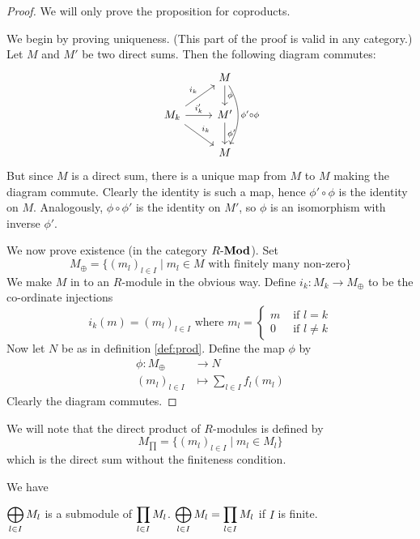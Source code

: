 \begin{proof}
	We will only prove the proposition for coproducts.
	
	We begin by proving uniqueness.
	(This part of the proof is valid in any category.)
	Let $M$ and $M'$ be two direct sums.
	Then the following diagram commutes:
	\[
		\begin{tikzcd}
			& M \arrow[d, "\phi"] \arrow[dd, "\phi'\circ\phi", bend left] \\
			M_k \arrow[ru, "i_k"] \arrow[r, "i_k'"] \arrow[rd, "i_k"] & M' \arrow[d, "\phi'"] \\
			& M
		\end{tikzcd}
	\]
	But since $M$ is a direct sum, there is a unique map from $M$ to $M$ making the diagram commute.
	Clearly the identity is such a map, hence $\phi'\circ\phi$ is the identity on $M$.
	Analogously, $\phi\circ\phi'$ is the identity on $M'$, so $\phi$ is an isomorphism with inverse $\phi'$.
	
	We now prove existence (in the category $R\mbox{-}\mathbf{Mod}$).
	Set
	\[M_\oplus = \{(m_l)_{l \in I} \mid m_l \in M \text{ with finitely many non-zero}\}\]
	We make $M$ in to an $R$-module in the obvious way.
	Define $i_k: M_k \to M_\oplus$ to be the co-ordinate injections
	\[i_k(m) = (m_l)_{l \in I} \text{ where } m_l =
		\begin{cases}
			m & \text{ if } l = k \\
			0 & \text{ if } l \neq k
		\end{cases}
	\]
	Now let $N$ be as in definition \ref{def:prod}.
	Define the map $\phi$ by
	\begin{align*}
		\phi: M_\oplus &\to N \\
		(m_l)_{l \in I} &\mapsto \sum_{l \in I}f_l(m_l)
	\end{align*}
	Clearly the diagram commutes.
\end{proof}
	
\begin{rmk}
	We will note that the direct product of $R$-modules is defined by
	\[M_{\prod} = \{(m_l)_{l \in I} \mid m_l \in M_l\}\]
	which is the direct sum without the finiteness condition.
\end{rmk}

\begin{rmk}
	We have
	\begin{enum}
		\io $\displaystyle \bigoplus_{l \in I} M_l$ is a submodule of $\displaystyle \prod_{l \in I} M_l$.
		\io $\displaystyle \bigoplus_{l \in I} M_l = \displaystyle \prod_{l \in I} M_l$ if $I$ is finite.
	\end{enum}
\end{rmk}
